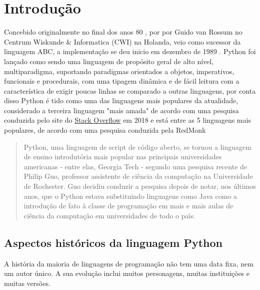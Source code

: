 


\chapter{ Introdu\c{c}\~{a}o}
Concebido originalmente no final dos anos 80 \cite{Int01}, por por Guido van Rossum no Centrum Wiskunde & Informatica (CWI) na Holanda, veio como sucessor da linguagem ABC, a implementação se deu inicio em dezembro de 1989 \cite{Int02}. Python foi lançado como sendo uma linguagem de propósito geral de alto nível, multiparadigma, suportando paradigmas orientados a objetos, imperativos, funcionais e procedurais, com uma tipagem dinâmica e de fácil leitura com a característica de exigir poucas linhas se comparado a outras linguagens, por conta disso Python é tido como uma das linguagens mais populares da atualidade, considerado a terceira linguagem "mais amada" de acordo com uma pesquisa conduzida pelo site do \href{https://stackoverflow.com/}{Stack Overflow} em 2018 \cite{Int03} e está entre as 5 linguagens mais populares, de acordo com uma pesquisa conduzida pela RedMonk \cite{Int04}

\begin{quote}
  Python, uma linguagem de script de c\'{o}digo aberto, se tornou a linguagem de ensino introdut\'{o}ria mais popular nas principais universidades americanas - entre elas, Georgia Tech - segundo uma pesquisa recente de Philip Guo, professor assistente de ci\^{e}ncia da computa\c{c}\~{a}o na Universidade de Rochester. Guo decidiu conduzir a pesquisa depois de notar, nos \'{u}ltimos anos, que o Python estava substituindo linguagens como Java como a introdu\c{c}\~{a}o de fato \`{a} classe de programa\c{c}\~{a}o em mais e mais aulas de ci\^{e}ncia da computa\c{c}\~{a}o em universidades de todo o pa\'{\i}s. \cite{Shein2015}
\end{quote}


   \section{Aspectos hist\'{o}ricos da linguagem Python}

A hist\'{o}ria da maioria de linguagens de programa\c{c}\~{a}o n\~{a}o tem uma data fixa, nem um autor \'{u}nico. A sua evolu\c{c}\~{a}o inclui muitos personagens, muitas institui\c{c}\~{o}es e muitas vers\~{o}es.

